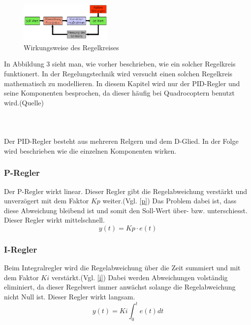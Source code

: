 \documentclass[12pt,a4paper, ngerman]{article}
\begin{document}
\begin{figure}
\centering
\includegraphics[width=0.4\textwidth]{Regelkreis2.png}
\caption[https://rn-wissen.de/wiki/images/5/5d/Regelkreis2.png]{Wirkungsweise des Regelkreises}
\end{figure}
In Abbildung 3 sieht man, wie vorher beschrieben, wie ein solcher Regelkreis funktionert. In der Regelungstechnik wird versucht einen solchen Regelkreis mathematisch zu modellieren. In diesem Kapitel wird nur der PID-Regler und seine Komponenten besprochen, da dieser häufig bei Quadrocoptern benutzt wird.(Quelle)\cite{website:rn-wissen_Regelungstechnik}
\\ \\ \\ \\
Der PID-Regler besteht aus mehreren Relgern und dem D-Glied. In der Folge wird beschrieben wie die einzelnen Komponenten wirken. 
\newpage
\subsubsection{P-Regler}
Der P-Regler wirkt linear. Dieser Regler gibt die Regelabweichung verstärkt und unverzögert mit dem Faktor $Kp$ weiter.(Vgl. \ref{p}) Das Problem dabei ist, dass diese Abweichung bleibend ist und somit den Soll-Wert über- bzw. unterschiesst. Dieser Regler wirkt mittelschnell.\cite{website:rn-wissen_Regelungstechnik}
\begin{equation}\label{p}
y(t)=Kp\cdot e(t)
\end{equation}

\subsubsection{I-Regler}
Beim Integralregler wird die Regelabweichung über die Zeit summiert und mit dem Faktor $Ki$ verstärkt.(Vgl. \ref{i}) Dabei werden Abweichungen volständig eliminiert, da dieser Regelwert immer anwächst solange die Regelabweichung nicht Null ist. Dieser Regler wirkt langsam.\cite{website:rn-wissen_Regelungstechnik}\\
\begin{equation}\label{i}
y(t)=Ki\int_{0}^{t}e(t)dt
\end{equation}
\end{document}
